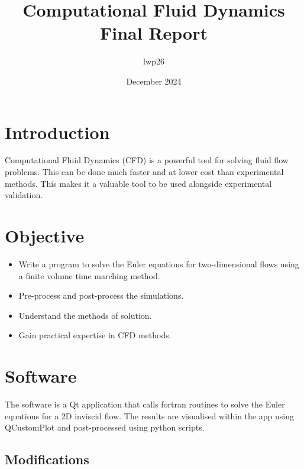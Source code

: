\documentclass{article}
\begin{document}
\title{Computational Fluid Dynamics \\
    \large Final Report}
\author{lwp26}
\date{December 2024}
\maketitle 

\section{Introduction}

Computational Fluid Dynamics (CFD) is a powerful tool for solving fluid flow problems.
This can be done much faster and at lower cost than experimental methods.
This makes it a valuable tool to be used alongside experimental validation.


\section{Objective}


\begin{itemize}
    \item Write a program to solve the Euler equations for two-dimensional flows using a finite volume time marching method.
    \item Pre-process and post-process the simulations.
    \item Understand the methods of solution.
    \item Gain practical expertise in CFD methods.
\end{itemize}

\section{Software}
The software is a Qt application that calls fortran routines to solve the Euler equations for a 2D inviscid flow.
The results are visualised within the app using QCustomPlot and post-processed using python scripts.
\subsection{Modifications}
\end{document}
